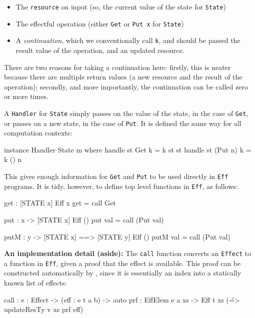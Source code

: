 \begin{itemize}
\item The \texttt{resource} on input (so, the current value of the state for
\texttt{State})
\item The effectful operation (either \texttt{Get} or \texttt{Put x} for
\texttt{State})
\item A \emph{continuation}, which we conventionally call \texttt{k},
and should be passed the result value of the
operation, and an updated resource.
\end{itemize}

\noindent
There are two reasons for taking a continuation here: firstly, this is neater
because there are multiple return values (a new resource and the result of
the operation); secondly, and more importantly, the continuation can be called
zero or more times.

A \texttt{Handler} for \texttt{State} simply passes on the value of the state,
in the case of \texttt{Get}, or passes on a new state, in the case of \texttt{Put}.
It is defined the same way for all computation contexts:

\begin{code}
instance Handler State m where
     handle st Get     k = k st st
     handle st (Put n) k = k () n
\end{code}

\noindent
This gives enough information for \texttt{Get} and \texttt{Put} to be used
directly in \texttt{Eff} programs. It is tidy, however, to define top level
functions in \texttt{Eff}, as follows:

\begin{code}
get : { [STATE x] } Eff x
get = call Get

put : x -> { [STATE x] } Eff () 
put val = call (Put val)

putM : y -> { [STATE x] ==> [STATE y] } Eff () 
putM val = call (Put val)
\end{code}

\noindent
\textbf{An implementation detail (aside):} 
The \texttt{call} function converts an \texttt{Effect} to a function in
\texttt{Eff}, given a proof that the effect is
available. This proof can be constructed automatically by \Idris{}, since it
is essentially an index into a statically known list of effects:

\begin{code}
call : {e : Effect} ->
       (eff : e t a b) -> {auto prf : EffElem e a xs} ->
       Eff t xs (\v => updateResTy v xs prf eff)
\end{code}

